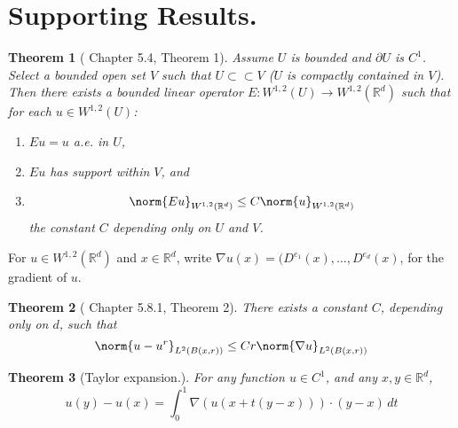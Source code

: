 \documentclass{article}
\newcommand{\Reals}{\mathbb{R}}
\newcommand{\1}{\mathbb{I}}
\newcommand{\Rd}{\Reals^d}
\theoremstyle{alden}
\theoremstyle{aldenthm}
\newtheorem{theorem}{Theorem}
\theoremstyle{definition}
\theoremstyle{remark}
\begin{document}
\section{Supporting Results.}

\begin{theorem}[\citep{evans10} Chapter 5.4, Theorem 1]
	\label{thm:evans_extension}
	Assume $U$ is bounded and $\partial U$ is $C^1$. Select a bounded open set $V$ such that $U \subset \subset V$ ($U$ is compactly contained in $V$). Then there exists a bounded linear operator $E: W^{1,2}(U) \to W^{1,2}(\Rd)$ such that for each $u \in W^{1,2}(U)$:
	\begin{enumerate}
		\item $Eu = u$ a.e. in $U$,
		\item $Eu$ has support within $V$, and 
		\item 
		\begin{equation*}
		\norm{Eu}_{W^{1,2}(\Rd)} \leq C \norm{u}_{W^{1,2}(\Rd)}
		\end{equation*}
		the constant $C$ depending only on $U$ and $V$.
	\end{enumerate}
\end{theorem}

For $u \in W^{1,2}(\Rd)$ and $x \in \Rd$, write $\nabla u(x) = (D^{e_1}(x),\ldots,D^{e_d}(x)$, for the gradient of $u$.

\begin{theorem}[\citep{evans10} Chapter 5.8.1, Theorem 2]
	\label{thm:evans_poincare}
	There exists a constant $C$, depending only on $d$, such that
	\begin{equation*}
	\norm{u - u^r}_{L^2(B(x,r))} \leq Cr\norm{\nabla u}_{L^2(B(x,r))}
	\end{equation*}
\end{theorem}

\begin{theorem}[Taylor expansion.]
	\label{thm:taylor_expansion}
	For any function $u \in C^1$, and any $x,y \in \Rd$, 
	\begin{equation*}
	u(y) - u(x) = \int_{0}^{1} \nabla(u(x + t(y - x))) \cdot (y - x) \,dt
	\end{equation*}
\end{theorem}
\end{document}
